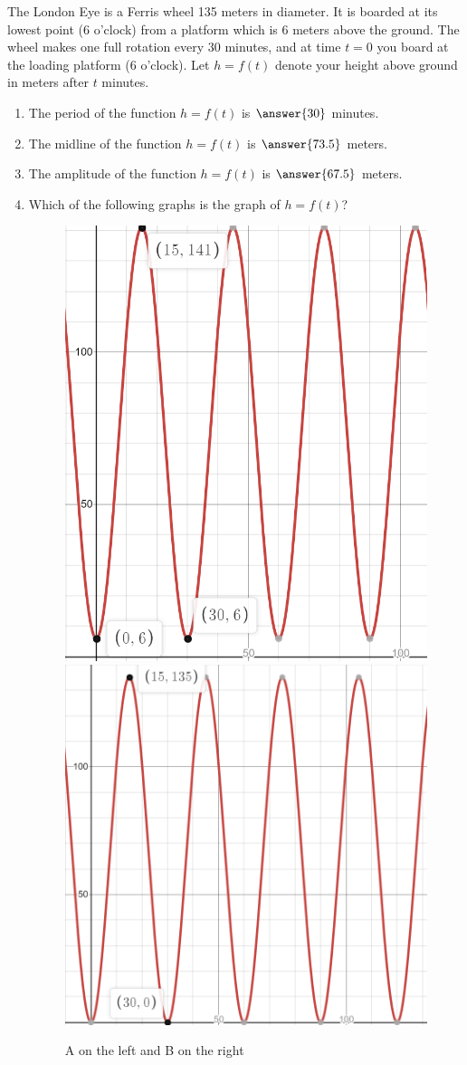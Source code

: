 \documentclass{ximera}
\author{Kenneth Berglund}
\begin{document}
\licenseAPC
\begin{exercise}
The London Eye is a Ferris wheel 135 meters in diameter. It is boarded at its lowest point (6 o'clock) from a platform which is 6 meters above the ground. The wheel makes one full rotation every 30 minutes, and at time $t = 0$ you board at the loading platform (6 o'clock). Let $h = f(t)$ denote your height above ground in meters after $t$ minutes.

\begin{enumerate}
\item The period of the function $h = f(t)$ is $\answer{30}$ minutes.

\item The midline of the function $h = f(t)$ is $\answer{73.5}$ meters.

\item The amplitude of the function $h = f(t)$ is $\answer{67.5}$ meters.

\item Which of the following graphs is the graph of $h = f(t)$?
\begin{figure}[!h]
\begin{image}
\includegraphics[width=.4\linewidth]{ex2-a.png}
\hspace{20mm}
\includegraphics[width=.4\linewidth]{ex2-b.png}

\end{image}
\caption{A on the left and B on the right}
\end{figure}


\end{enumerate}
\end{exercise}
\end{document}
